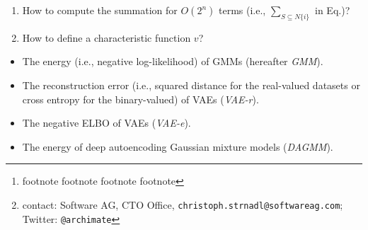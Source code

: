 \documentclass{IEEEtran}
\author{
	Philip Hauer\thanks{  footnote  footnote  footnote  footnote },~Karl Flöthner,~Dimitri Schaab,~Jonathan Ottnad,~Viktor Ratza,~Markus Ball,~Bernhard Ketzer\\
	Helmholtz-Institut für Strahlen- und Kernphysik\\
	Universität Bonn\\
	53115 Bonn - Germany
}
\author{Christoph F. Strnadl\footnote{contact: Software AG, CTO Office, \texttt{christoph.strnadl@softwareag.com}; Twitter: \texttt{@archimate}}\;, IEEE \emph{Senior Member}}
\begin{document}
       \begin{enumerate}
    \item How to compute the summation for $O(2^n)$ terms (i.e., $\sum_{S \subseteq N \{i\}}$ in Eq.)?
    \item How to define a characteristic function $v$?
\end{enumerate}

       \begin{itemize}[leftmargin=3ex,topsep=0.5ex,itemsep=0.32ex]
    \item The energy (i.e., negative log-likelihood) of GMMs (hereafter \textsl{GMM}).
    \item The reconstruction error (i.e., squared distance for the real-valued datasets or cross entropy for the binary-valued) of VAEs (\textsl{VAE-r}).
    \item The negative ELBO of VAEs (\textsl{VAE-e}).
    \item The energy of deep autoencoding Gaussian mixture models \cite{zong_deep_2018} (\textsl{DAGMM}).
\end{itemize}
\end{document}
